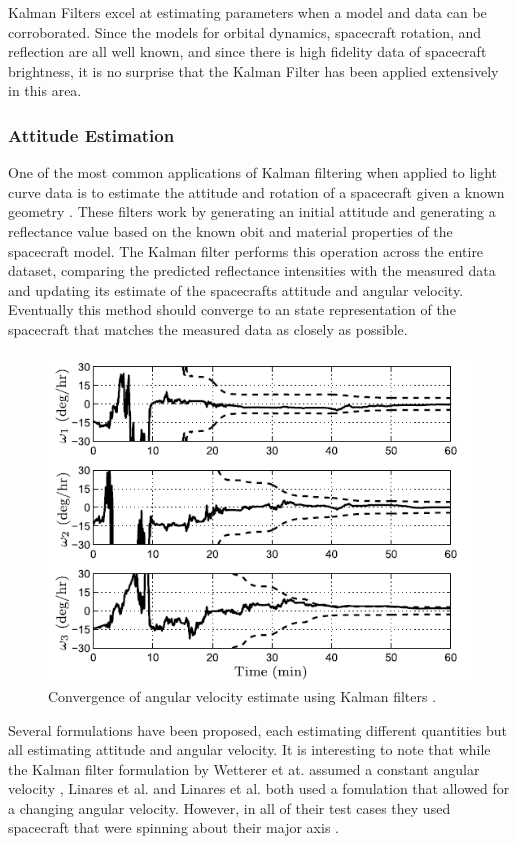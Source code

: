 \documentclass{article}
\begin{document}
Kalman Filters excel at estimating parameters when a model and data can be corroborated. Since the models for orbital dynamics, spacecraft rotation, and reflection are all well known, and since there is high fidelity data of spacecraft brightness, it is no surprise that the Kalman Filter has been applied extensively in this area.

\subsubsection{Attitude Estimation}
One of the most common applications of Kalman filtering when applied to light curve data is to estimate the attitude and rotation of a spacecraft given a known geometry \cite{AttitudeEstimationFromLightCurve} \cite{LINARES20141} \cite{SpaceObjectCharacterization}. These filters work by generating an initial attitude and generating a reflectance value based on the known obit and material properties of the spacecraft model. The Kalman filter performs this operation across the entire dataset, comparing the predicted reflectance intensities with the measured data and updating its estimate of the spacecrafts attitude and angular velocity. Eventually this method should converge to an state representation of the spacecraft that matches the measured data as closely as possible.

\begin{figure}[h]
	\centering
	\includegraphics[width=.5\textwidth]{Kalman_convergence}
	\caption{Convergence of angular velocity estimate using Kalman filters \cite{SpaceObjectCharacterization}.}
\end{figure}

Several formulations have been proposed, each estimating different quantities but all estimating attitude and angular velocity. It is interesting to note that while the Kalman filter formulation by Wetterer et at. assumed a constant angular velocity \cite{AttitudeEstimationFromLightCurve}, Linares et al. and Linares et al. both used a fomulation that allowed for a changing angular velocity. However, in all of their test cases they used spacecraft that were spinning about their major axis \cite{LINARES20141} \cite{SpaceObjectCharacterization}.
\end{document}
